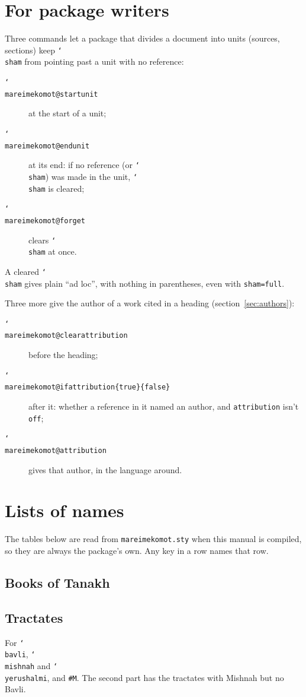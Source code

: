 \documentclass[11pt]{article}
\newcommand{\cs}[1]{\texttt{\char`\\#1}}
\begin{document}
\section{For package writers}\label{sec:packages}

Three commands let a package that divides a document into units (sources, sections) keep
\cs{sham} from pointing past a unit with no reference:
\begin{description}
\item[\cs{mareimekomot@startunit}] at the start of a unit;
\item[\cs{mareimekomot@endunit}] at its end: if no reference (or \cs{sham}) was made in the unit,
	\cs{sham} is cleared;
\item[\cs{mareimekomot@forget}] clears \cs{sham} at once.
\end{description}
A cleared \cs{sham} gives plain ``ad loc'', with nothing in parentheses, even with
\texttt{sham=full}.

Three more give the author of a work cited in a heading (section~\ref{sec:authors}):
\begin{description}
\item[\cs{mareimekomot@clearattribution}] before the heading;
\item[\cs{mareimekomot@ifattribution}\texttt{\{true\}\{false\}}] after it: whether a reference
	in it named an author, and \texttt{attribution} isn't \texttt{off};
\item[\cs{mareimekomot@attribution}] gives that author, in the language around.
\end{description}

\clearpage
\appendix
\section{Lists of names}

The tables below are read from \texttt{mareimekomot.sty} when this manual is compiled, so they
are always the package's own. Any key in a row names that row.

\subsection{Books of Tanakh}

\subsection{Tractates}
For \cs{bavli}, \cs{mishnah} and \cs{yerushalmi}, and \verb|#M|. The second part has the
tractates with Mishnah but no Bavli.
\end{document}
